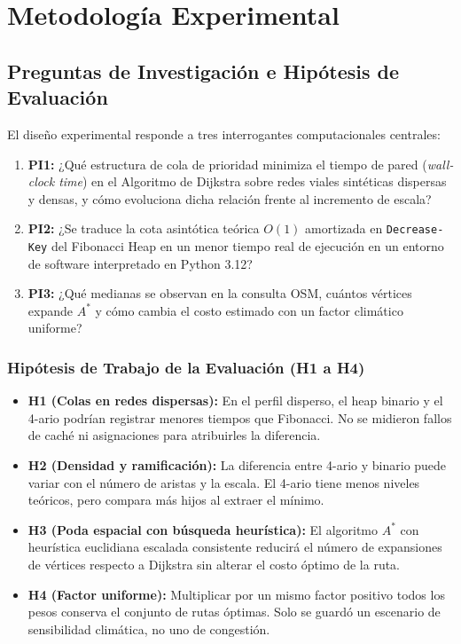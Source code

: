 \section{Metodología Experimental}
\label{sec:metodologia}

\subsection{Preguntas de Investigación e Hipótesis de Evaluación}
El diseño experimental responde a tres interrogantes computacionales centrales:
\begin{enumerate}
    \item \textbf{PI1:} ¿Qué estructura de cola de prioridad minimiza el tiempo de pared (\textit{wall-clock time}) en el Algoritmo de Dijkstra sobre redes viales sintéticas dispersas y densas, y cómo evoluciona dicha relación frente al incremento de escala?
    \item \textbf{PI2:} ¿Se traduce la cota asintótica teórica $O(1)$ amortizada en \texttt{Decrease-Key} del Fibonacci Heap en un menor tiempo real de ejecución en un entorno de software interpretado en Python 3.12?
    \item \textbf{PI3:} ¿Qué medianas se observan en la consulta OSM, cuántos vértices expande $A^*$ y cómo cambia el costo estimado con un factor climático uniforme?
\end{enumerate}

\subsubsection{Hipótesis de Trabajo de la Evaluación (H1 a H4)}
\begin{itemize}
    \item \textbf{H1 (Colas en redes dispersas):} En el perfil disperso, el heap binario y el 4-ario podrían registrar menores tiempos que Fibonacci. No se midieron fallos de caché ni asignaciones para atribuirles la diferencia.
    \item \textbf{H2 (Densidad y ramificación):} La diferencia entre 4-ario y binario puede variar con el número de aristas y la escala. El 4-ario tiene menos niveles teóricos, pero compara más hijos al extraer el mínimo.
    \item \textbf{H3 (Poda espacial con búsqueda heurística):} El algoritmo $A^*$ con heurística euclidiana escalada consistente reducirá el número de expansiones de vértices respecto a Dijkstra sin alterar el costo óptimo de la ruta.
    \item \textbf{H4 (Factor uniforme):} Multiplicar por un mismo factor positivo todos los pesos conserva el conjunto de rutas óptimas. Solo se guardó un escenario de sensibilidad climática, no uno de congestión.
\end{itemize}

